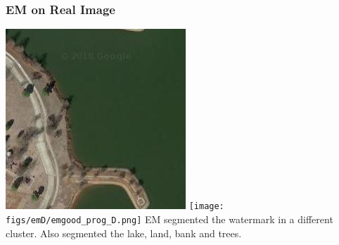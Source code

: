 \documentclass[11pt]{beamer}
\begin{document}
\begin{frame}
\frametitle{EM on Real Image}
\includegraphics[width=.45\textwidth]{mosaicD.jpg}
\texttt{[image: figs/emD/emgood\_prog\_D.png]}
EM segmented the watermark in a different cluster. Also segmented the lake, land, bank and trees.
\end{frame}

\end{document}
